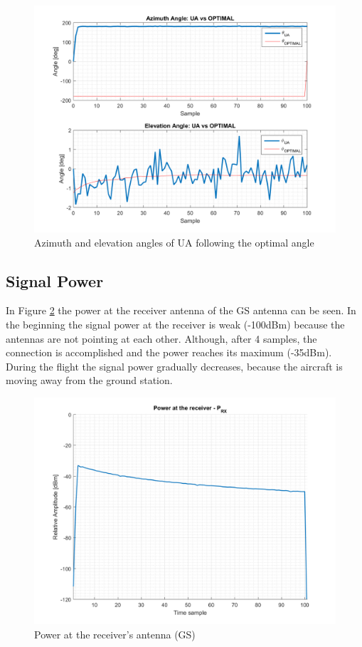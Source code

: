 \begin{figure}[H]
	\centering
	\includegraphics[scale=0.8]{figures/s2_ua.png}
	\caption{Azimuth and elevation angles of UA following the optimal angle}
	\label{fig:s2_ua}
\end{figure}


\subsection*{Signal Power}
In Figure \ref{fig:s2_power} the power at the receiver antenna of the GS antenna can be seen. In the beginning the signal power at the receiver is weak (-100dBm) because the antennas are not pointing at each other. Although, after 4 samples, the connection is accomplished and the power reaches its maximum (-35dBm). During the flight the signal power gradually decreases, because the aircraft is moving away from the ground station. 

\begin{figure}[H]
	\centering
	\includegraphics[scale=0.8]{figures/s2_power.png}
	\caption{Power at the receiver's antenna (GS)}
	\label{fig:s2_power}
\end{figure}

